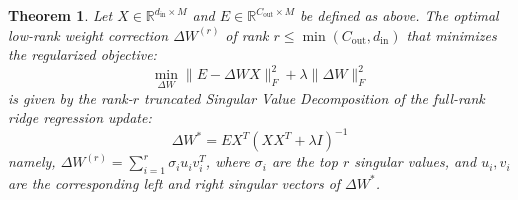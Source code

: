 \documentclass{article}
\theoremstyle{plain}
\newtheorem{theorem}{Theorem}[section]
\theoremstyle{definition}
\theoremstyle{remark}
\begin{document}
\begin{theorem}
\label{thm:svd_approx}
Let $X \in \mathbb{R}^{d_{\text{in}} \times M}$ and $E \in \mathbb{R}^{C_{\text{out}} \times M}$ be defined as above. The optimal low-rank weight correction $\Delta W^{(r)}$ of rank $r \le \min(C_{\text{out}}, d_{\text{in}})$ that minimizes the regularized objective:
\begin{equation}
  \min_{\Delta W} \| E - \Delta W X \|_F^2 + \lambda \| \Delta W \|_F^2
\end{equation}
is given by the rank-$r$ truncated Singular Value Decomposition of the full-rank ridge regression update:
\begin{equation}
  \Delta W^* = E X^T (X X^T + \lambda I)^{-1}
\end{equation}
namely, $\Delta W^{(r)} = \sum_{i=1}^r \sigma_i u_i v_i^T$, where $\sigma_i$ are the top $r$ singular values, and $u_i, v_i$ are the corresponding left and right singular vectors of $\Delta W^*$.
\end{theorem}
\end{document}
